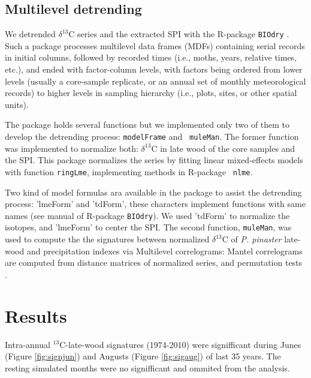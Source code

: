 \documentclass[review,authoryear]{elsarticle}
\begin{document}
\subsection{Multilevel detrending}
We detrended $\delta^{13}$C series and the extracted SPI with
the R-package {\tt BIOdry} \citep{Lara2015b,Lara2013}. Such a package
processes multilevel data frames (MDFs) containing serial records in
initial columns, followed by recorded times (i.e., moths, years,
relative times, etc.), and ended with factor-column levels, with
factors being ordered from lower levels (usually a core-sample
replicate, or an annual set of monthly meteorological records) to
higher levels in sampling hierarchy (i.e., plots, sites, or other
spatial units). 

The package holds several functions but we implemented only two of
them to develop the detrending process: {\tt modelFrame} and {\tt
  muleMan}. The former function was implemented to normalize both:
$\delta^{13}$C in late wood of the core samples and the SPI. This
package normalizes the series by fitting linear mixed-effects models
with function {\tt ringLme}, implementing methods in R-package {\tt
  nlme}.

Two kind of model formulas ara available in the package to assist the
detrending process: 'lmeForm' and 'tdForm', these characters implement
functions with same names (see manual of R-package {\tt BIOdry}). We
used 'tdForm' to normalize the isotopes, and 'lmeForm' to center the
SPI. The second function, {\tt muleMan}, was used to compute the the
signatures between normalized $\delta^{13}$C of \textit{P. pinaster}
late-wood and precipitation indexes via Multilevel correlograms:
Mantel correlograms are computed from distance matrices of normalized
series, and permutation tests \citep{Goslee2007}.


\section{Results}


Intra-annual $^{13}$C-late-wood signatures (1974-2010) were
signifficant during Junes (Figure \ref{fig:signjun}) and Augusts
(Figure \ref{fig:sigaug}) of last 35 years. The resting simulated
months were no signifficant and ommited from the analysis.

\newpage
\section{\refname}


\end{document}
